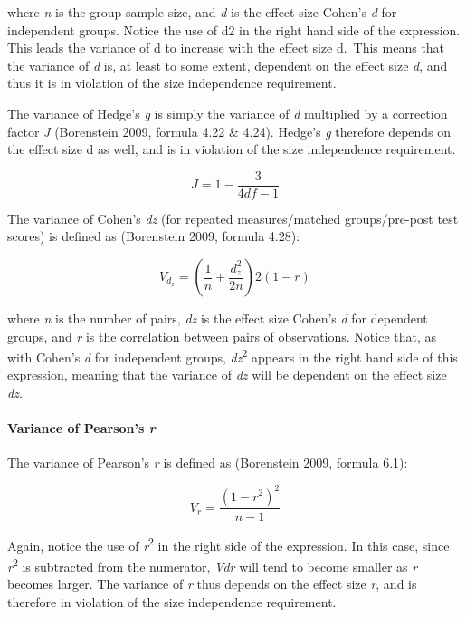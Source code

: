 \documentclass[]{article}
\let\oldparagraph\paragraph
\renewcommand{\paragraph}[1]{\oldparagraph{#1}\mbox{}}
\begin{document}
where \emph{n} is the group sample size, and \emph{d} is the effect size
Cohen's \emph{d} for independent groups. Notice the use of d2 in the
right hand side of the expression. This leads the variance of d to
increase with the effect size d.~This means that the variance of
\emph{d} is, at least to some extent, dependent on the effect size
\emph{d}, and thus it is in violation of the size independence
requirement.

The variance of Hedge's \emph{g} is simply the variance of \emph{d}
multiplied by a correction factor \emph{J} (Borenstein 2009, formula
4.22 \& 4.24). Hedge's \emph{g} therefore depends on the effect size d
as well, and is in violation of the size independence requirement.

\[
\begin{equation}
J=1-\frac{3}{4df-1}
\label{eq:Jcor}
\tag{3}
\end{equation}
\]

The variance of Cohen's \emph{dz} (for repeated measures/matched
groups/pre-post test scores) is defined as (Borenstein 2009, formula
4.28):

\[
\begin{equation}
V_{d_z}=(\frac{1}{n}+\frac{d_z^2}{2n})2(1-r)
\label{eq:vardwit}
\tag{4}
\end{equation}
\]

where \emph{n} is the number of pairs, \emph{dz} is the effect size
Cohen's \emph{d} for dependent groups, and \emph{r} is the correlation
between pairs of observations. Notice that, as with Cohen's \emph{d} for
independent groups, \emph{dz}\textsuperscript{2} appears in the right
hand side of this expression, meaning that the variance of \emph{dz}
will be dependent on the effect size \emph{dz}.

\hypertarget{variance-of-pearsons-r}{%
\paragraph{\texorpdfstring{Variance of Pearson's
\emph{r}}{Variance of Pearson's r}}\label{variance-of-pearsons-r}}

The variance of Pearson's \emph{r} is defined as (Borenstein 2009,
formula 6.1):

\[
\begin{equation}
V_r=\frac{(1-r^2)^2}{n-1}
\label{eq:varr}
\tag{5}
\end{equation}
\]

Again, notice the use of \emph{r}\textsuperscript{2} in the right side
of the expression. In this case, since \emph{r}\textsuperscript{2} is
subtracted from the numerator, \emph{Vdr} will tend to become smaller as
\emph{r} becomes larger. The variance of \emph{r} thus depends on the
effect size \emph{r}, and is therefore in violation of the size
independence requirement.
\end{document}
